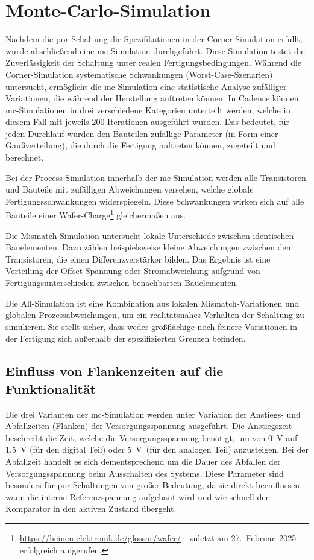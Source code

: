\section{Monte-Carlo-Simulation}
Nachdem die \gls{por}-Schaltung die Spezifikationen in der Corner Simulation erfüllt, wurde abschließend eine \gls{mc}-Simulation durchgeführt. Diese Simulation testet die Zuverlässigkeit der Schaltung unter realen Fertigungsbedingungen. Während die Corner-Simulation systematische Schwankungen (Worst-Case-Szenarien) untersucht, ermöglicht die \gls{mc}-Simulation eine statistische Analyse zufälliger Variationen, die während der Herstellung auftreten können. In Cadence können \gls{mc}-Simulationen in drei verschiedene Kategorien unterteilt werden, welche in diesem Fall mit jeweils 200 Iterationen ausgeführt wurden. Das bedeutet, für jeden Durchlauf wurden den Bauteilen zufällige Parameter (in Form einer Gaußverteilung), die durch die Fertigung auftreten können, zugeteilt und berechnet. 

Bei der Process-Simulation innerhalb der \gls{mc}-Simulation werden alle Transistoren und Bauteile mit zufälligen Abweichungen versehen, welche globale Fertigungsschwankungen widerspiegeln. Diese Schwankungen wirken sich auf alle Bauteile einer Wafer-Charge\footnote{\url{https://heinen-elektronik.de/glossar/wafer/} --\,zuletzt am 27.~Februar~2025 erfolgreich aufgerufen.} gleichermaßen aus. 

Die Mismatch-Simulation untersucht lokale Unterschiede zwischen identischen Bauelementen. Dazu zählen beispielsweise kleine Abweichungen zwischen den Transistoren, die einen Differenzverstärker bilden. Das Ergebnis ist eine Verteilung der Offset-Spannung oder Stromabweichung aufgrund von Fertigungsunterschieden zwischen benachbarten Bauelementen.

Die All-Simulation ist eine Kombination aus lokalen Mismatch-Variationen und globalen Prozessabweichungen, um ein realitätsnahes Verhalten der Schaltung zu simulieren. Sie stellt sicher, dass weder großflächige noch feinere Variationen in der Fertigung sich außerhalb der spezifizierten Grenzen befinden. 

\subsection{Einfluss von Flankenzeiten auf die Funktionalität}
Die drei Varianten der \gls{mc}-Simulation werden unter Variation der Anstiegs- und Abfallzeiten (Flanken) der Versorgungsspannung ausgeführt. Die Anstiegszeit beschreibt die Zeit, welche die Versorgungsspannung benötigt, um von 0~V auf 1.5~V (für den digital Teil) oder 5~V~(für den analogen Teil) anzusteigen. Bei der Abfallzeit handelt es sich dementsprechend um die Dauer des Abfallen der Versorgungsspannung beim Ausschalten des Systems. Diese Parameter sind besonders für \gls{por}-Schaltungen von großer Bedeutung, da sie direkt beeinflussen, wann die interne Referenzspannung aufgebaut wird und wie schnell der Komparator in den aktiven Zustand übergeht. 

